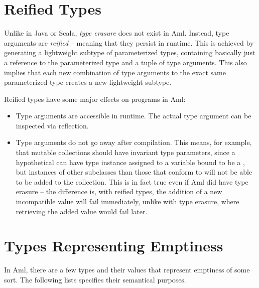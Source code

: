 \section{Reified Types}
\label{sec:reified-types}

Unlike in Java or Scala, {\em type erasure} does not exist in Aml. Instead, type arguments are {\em reified} -- meaning that they persist in runtime. This is achieved by generating a lightweight subtype of parameterized types, containing basically just a reference to the parameterized type and a tuple of type arguments. This also implies that each new combination of type arguments to the exact same parameterized type creates a new lightweight subtype.

Reified types have some major effects on programs in Aml:
\begin{itemize}

\item Type arguments are accessible in runtime. The actual type argument can be inspected via reflection. 

\item Type arguments do not go away after compilation. This means, for example, that mutable collections should have invariant type parameters, since a hypothetical  can have type instance  assigned to a variable bound to be a , but instances of other subclasses than those that conform to  will not be able to be added to the collection. This is in fact true even if Aml did have type erasure -- the difference is, with reified types, the addition of a new incompatible value will fail immediately, unlike with type erasure, where retrieving the added value would fail later. 
\end{itemize}





\section{Types Representing Emptiness}
\label{sec:emptiness}

In Aml, there are a few types and their values that represent emptiness of some sort. The following lists specifies their semantical purposes. 

